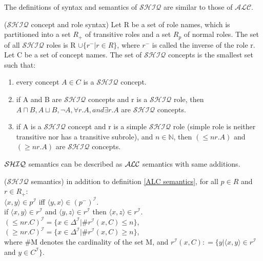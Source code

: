 The definitions of syntax and semantics of $\mathcal{SHIQ}$ are similar to those of $\mathcal{ALC}$.
\begin{mydef} 
\cite{handbook} ($\mathcal{SHIQ}$ concept and role syntax) Let R be a set of role names, which is partitioned into a set $R_+$ of transitive roles and a set $R_p$ of normal roles. 
The set of all $\mathcal{SHIQ}$ roles is R $\cup \{r^- | r \in R\}$, where $r^-$ is called the inverse of the role r. \\
Let C be a set of concept names. The set of $\mathcal{SHIQ}$ concepts is the smallest set such that:  
\begin{enumerate}
\item every concept $A \in C$ is a $\mathcal{SHIQ}$ concept.
\item if A and B are $\mathcal{SHIQ}$ concepts and r is a $\mathcal{SHIQ}$ role, then $A\sqcap B, A\sqcup B,  \neg A, \forall r.A,  and \exists r.A$ are $\mathcal{SHIQ}$ concepts.
\item if A is a $\mathcal{SHIQ}$ concept and r is a simple $\mathcal{SHIQ}$ role (simple role is neither transitive nor has a transitive subrole), and $n \in \mathbb{N}$, then $(\leq n r.A)$  and 
$(\geq n r.A)$ are $\mathcal{SHIQ}$ concepts.
\end{enumerate}
\end{mydef}
$\mathcal{SHIQ}$ semantics can be described as $\mathcal{ALC}$ semantics with same additions.

 \begin{mydef}($\mathcal{SHIQ}$ semantics) \cite{handbook}
in addition to definition \ref{ALC semantics}, for all  $p \in R$ and $r \in R_+$: \\
 $\langle x,y \rangle \in p^\mathcal{I}$ iff  $\langle y,x \rangle \in (p^- )^\mathcal{I}$. \\
 if $\langle x,y \rangle \in r^\mathcal{I}$ and $ \langle y,z \rangle \in r^\mathcal{I}$ then $\langle x,z \rangle \in r^\mathcal{I}$.\\
 $(\leq n r.C)^\mathcal{I} = \{x \in \Delta ^\mathcal{I} | \# r^\mathcal{I} (x,C) \leq n\}$,\\
$(\geq n r.C)^\mathcal{I} = \{x \in \Delta ^\mathcal{I} | \# r^\mathcal{I} (x,C) \geq n\}$,\\

where \#M  denotes the cardinality of the set M, and $r^\mathcal{I} (x,C) \mathrel{\mathop:}= \{y | \langle x,y \rangle \in r^\mathcal{I}$ and $y \in C^\mathcal{I}\}$.
\end{mydef}

